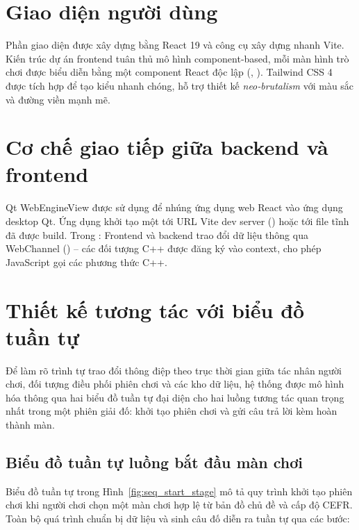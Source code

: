\section{Giao diện người dùng}
\label{sec:frontend}
Phần giao diện được xây dựng bằng React 19 và công cụ xây dựng nhanh Vite.  Kiến trúc dự án frontend tuân thủ mô hình component‑based, mỗi màn hình trò chơi được biểu diễn bằng một component React độc lập (, ).  Tailwind CSS 4 được tích hợp để tạo kiểu nhanh chóng, hỗ trợ thiết kế \textit{neo‑brutalism} với màu sắc và đường viền mạnh mẽ.

\section{Cơ chế giao tiếp giữa backend và frontend}
\label{sec:communication}
Qt WebEngineView được sử dụng để nhúng ứng dụng web React vào ứng dụng desktop Qt. Ứng dụng khởi tạo một  tới URL Vite dev server () hoặc tới file tĩnh  đã được build. Trong :
Frontend và backend trao đổi dữ liệu thông qua WebChannel () – các đối tượng C++ được đăng ký vào context, cho phép JavaScript gọi các phương thức C++.

\section{Thiết kế tương tác với biểu đồ tuần tự}
\label{sec:interaction_design}

Để làm rõ trình tự trao đổi thông điệp theo trục thời gian giữa tác nhân người chơi, đối tượng điều phối phiên chơi và các kho dữ liệu, hệ thống được mô hình hóa thông qua hai biểu đồ tuần tự đại diện cho hai luồng tương tác quan trọng nhất trong một phiên giải đố: khởi tạo phiên chơi và gửi câu trả lời kèm hoàn thành màn.

\subsection{Biểu đồ tuần tự luồng bắt đầu màn chơi}
\label{subsec:seq_start_stage}

Biểu đồ tuần tự trong Hình~\ref{fig:seq_start_stage} mô tả quy trình khởi tạo phiên chơi khi người chơi chọn một màn chơi hợp lệ từ bản đồ chủ đề và cấp độ CEFR. Toàn bộ quá trình chuẩn bị dữ liệu và sinh câu đố diễn ra tuần tự qua các bước:

